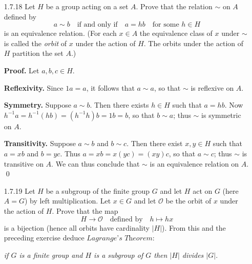 \begin{enumerate}
      \textbf{Proof.} Let $g \in G$. Define $\sigma_g : G \rightarrow G$ by
      $x \mapsto gxg^{-1}$. This map is bijective since it has a 2-sided
      inverse, namely $\sigma_{g^{-1}}$. So it remains to show that $\sigma_g$
      is a homomorphism. This follows immediately because
      \begin{align*}
         \sigma_g(xy) = gxyg^{-1} = gxg^{-1}gyg^{-1} = \sigma_g(x)\sigma_g(y)
      \end{align*}
      for all $x, y \in G$. By Exercise 1.6.2, it follows that
      $|x| = |\sigma_g(x)| = |gxg^{-1}|$ for all $x \in G$. Let $A \subseteq G$.
      Then the map $\alpha_g : A \rightarrow gAg^{-1}$ defined by
      $a \mapsto gag^{-1}$ is also bijective (its 2-sided inverse is
      $\alpha_{g^{-1}}$); thus $|A| = |gAg^{-1}|$. \qed      
   \item[1.7.18]  Let $H$ be a group acting on a set $A$. Prove that the
                  relation $\sim$ on $A$ defined by
                  $$a \sim b \quad \text{if and only if} \quad
                    a = hb \quad \text{for some }h \in H$$
                  is an equivalence relation. (For each $x \in A$ the
                  equivalence class of $x$ under $\sim$ is called the
                  \textit{orbit} of $x$ under the action of $H$. The orbits
                  under the action of $H$ partition the set $A$.)

      \textbf{Proof.} Let $a, b, c \in H$.

      \textbf{Reflexivity.} Since $1a = a$, it follows that $a \sim a$, so that
      $\sim$ is reflexive on $A$.

      \textbf{Symmetry.} Suppose $a \sim b$. Then there exists $h \in H$ such
      that $a = hb$. Now $h^{-1}a = h^{-1}(hb) = (h^{-1}h)b = 1b = b$, so that
      $b \sim a$; thus $\sim$ is symmetric on $A$.

      \textbf{Transitivity.} Suppose $a \sim b$ and $b \sim c$. Then there exist
      $x, y \in H$ such that $a = xb$ and $b = yc$. Thus
      $a = xb = x(yc) = (xy)c$, so that $a \sim c$; thus $\sim$ is transitive on 
      $A$. We can thus conclude that $\sim$ is an equivalence relation on $A$. 
      \qed
   \item[1.7.19]  Let $H$ be a subgroup of the finite group $G$ and let $H$ act
                  on $G$ (here $A = G$) by left multiplication. Let $x \in G$
                  and let $\mathcal{O}$ be the orbit of $x$ under the action of
                  $H$. Prove that the map
                  $$H \rightarrow \mathcal{O}\quad \text{defined by} \quad
                    h \mapsto hx$$
                  is a bijection (hence all orbits have cardinality $|H|$). From
                  this and the preceding exercise deduce
                  $\textit{Lagrange's Theorem}:$
                  \begin{center}
                     \textit{if $G$ is a finite group and $H$ is a subgroup of
                     $G$ then $|H|$ divides $|G|$}.
                  \end{center}
                  

\end{enumerate}
